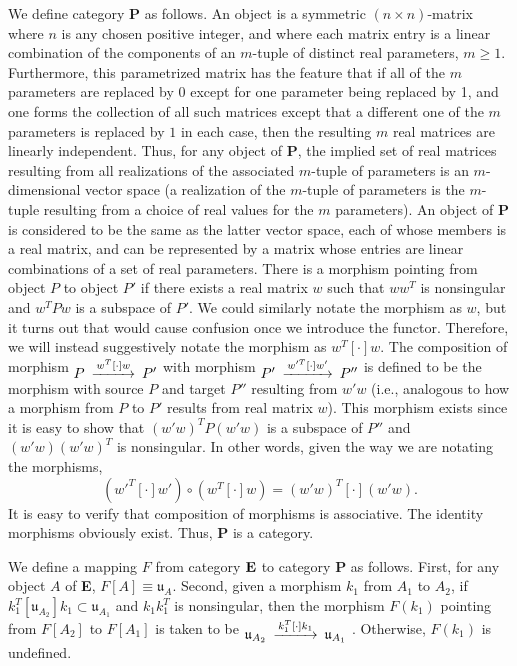 \documentclass{amsart}
\numberwithin{equation}{section}
\theoremstyle{definition}
\numberwithin{theorem}{section}
\begin{document}
We define category {\bf P} as follows. An object is a symmetric $(n\times n)$-matrix where $n$ is any chosen positive integer, and where each matrix entry is a linear combination of the components of an $m$-tuple of distinct real parameters, $m\ge 1$.  Furthermore, this parametrized matrix has the feature that if all of the $m$ parameters are replaced by 0 except for one parameter being replaced by 1, and one forms the collection of all such matrices except that a different one of the $m$ parameters is replaced by $1$ in each case, then the resulting $m$ real matrices are linearly independent.  Thus, for any object of {\bf P}, the implied set of real matrices resulting from all realizations of the associated $m$-tuple of parameters is an $m$-dimensional vector space (a realization of the $m$-tuple of parameters is the $m$-tuple resulting from a choice of real values for the $m$ parameters).  An object of {\bf P} is considered to be the same as the latter vector space, each of whose members is a real matrix, and can be represented by a matrix whose entries are linear combinations of a set of real parameters.   There is a morphism pointing from object $P$ to object $P'$ if there exists a real matrix $w$ such that $ww^T$ is nonsingular and $w^TPw$ is a subspace of $P'$.  We could similarly notate the morphism as $w$, but it turns out that would cause confusion once we introduce the functor.  Therefore, we will instead suggestively notate the morphism as $w^T[\cdot]w$.    The composition of morphism $\begin{CD}  P @>w^T[\cdot]w>> P'\end{CD}$ with morphism $\begin{CD}  P' @>w'^T[\cdot]w'>> P''\end{CD}$ is defined to be the morphism with source $P$ and target $P''$ resulting from $w'w$ (i.e., analogous to how a morphism from $P$ to $P'$ results from real matrix $w$).  This morphism exists since it is easy to show that $(w'w)^TP(w'w)$ is a subspace of $P''$ and $(w'w)(w'w)^T$ is nonsingular. In other words, given the way we are notating the morphisms, \begin{equation}\label{2/22/25.1}(w'^T[\cdot]w')\circ (w^T[\cdot]w) = (w'w)^T[\cdot](w'w).\end{equation} It is easy to verify that composition of morphisms is associative. The identity morphisms obviously exist. Thus, {\bf P} is a category.

We define a mapping $F$ from category ${\bf E}$ to category {\bf P} as follows.  First, for any object $A$ of {\bf E}, $F[
A] \equiv \mathfrak{u}_A$.  Second, given a morphism $k_1$ from $A_1$ to $A_2$, if $k_1^T[\mathfrak{u}_{A_2}]k_1 \subset \mathfrak{u}_{A_1}$ and $k_1k_1^T$ is nonsingular, then the morphism $F(k_1)$ pointing from $F[A_2]$ to $F[A_1]$ is taken to be $\begin{CD}  \mathfrak{u}_{A_2} @>k_1^T[\cdot]k_1>> \mathfrak{u}_{A_1}\end{CD}$ .  Otherwise, $F(k_1)$ is undefined.
\end{document}
